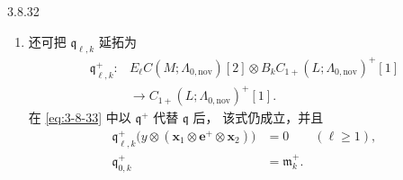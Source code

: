 \begin{theorem}{3.8.32}
\begin{enumerate}[label=\textup{(\arabic*)},leftmargin=2.8em]
  \item 还可把 $\mathfrak q_{\ell,k}$ 延拓为
  \[
  \begin{aligned}
   \mathfrak q^+_{\ell,k}\colon{}&
   E_\ell C(M;\Lambda_{0,\mathrm{nov}})[2]
   \otimes
   B_kC_{1+}(L;\Lambda_{0,\mathrm{nov}})^+[1]\\
   &\longrightarrow
   C_{1+}(L;\Lambda_{0,\mathrm{nov}})^+[1].
  \end{aligned}
  \]
  在 \eqref{eq:3-8-33} 中以 $\mathfrak q^+$ 代替 $\mathfrak q$ 后，
  该式仍成立，并且
  \begin{align}
   \mathfrak q^+_{\ell,k}
   \bigl(y\otimes
    (\mathbf x_1\otimes\mathbf e^+\otimes\mathbf x_2)\bigr)
   &=0
   \qquad(\ell\geq1),
   \tag{3.8.35.1}\label{eq:3-8-35-1}\\
   \mathfrak q^+_{0,k}
   &=\mathfrak m_k^+.
   \tag{3.8.35.2}\label{eq:3-8-35-2}
  \end{align}


\end{enumerate}
\end{theorem}
